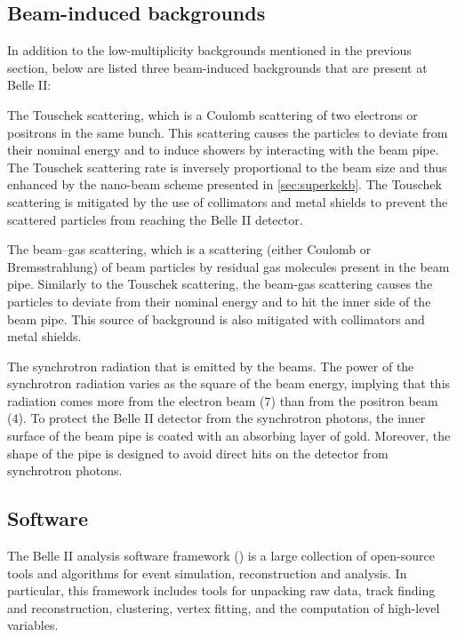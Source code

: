 \subsection{Beam-induced backgrounds}
In addition to the low-multiplicity backgrounds mentioned in the previous section, below are listed three beam-induced backgrounds that are present at Belle II:
\bi
\item The Touschek scattering, which is a Coulomb scattering of two electrons or positrons in the same bunch. This scattering causes the particles to deviate from their nominal energy and to induce showers by interacting with the beam pipe.
The Touschek scattering rate is inversely proportional to the beam size and thus enhanced by the nano-beam scheme presented in \cref{sec:superkekb}.
The Touschek scattering is mitigated by the use of collimators and metal shields to prevent the scattered particles from reaching the Belle II detector.
\item The beam–gas scattering, which is a scattering (either Coulomb or Bremsstrahlung) of beam particles by residual gas molecules present in the beam pipe.
Similarly to the Touschek scattering, the beam-gas scattering causes the particles to deviate from their nominal energy and to hit the inner side of the beam pipe.
This source of background is also mitigated with collimators and metal shields.
\item The synchrotron radiation that is emitted by the beams.
The power of the synchrotron radiation varies as the square of the beam energy, implying that this radiation comes more from the electron beam (7\gev) than from the positron beam (4\gev).
To protect the Belle II detector from the synchrotron photons, the inner surface of the beam pipe is coated with an absorbing layer of gold.
Moreover, the shape of the pipe is designed to avoid direct hits on the detector from synchrotron photons.
\ei
\subsection{Software} \label{sec:software}
The Belle II analysis software framework (\basft) \cite{Kuhr2019} is a large collection of open-source tools and algorithms for event simulation, reconstruction and analysis.
In particular, this framework includes tools for unpacking raw data, track finding and reconstruction, \ECL clustering, vertex fitting, and the computation of high-level variables.

